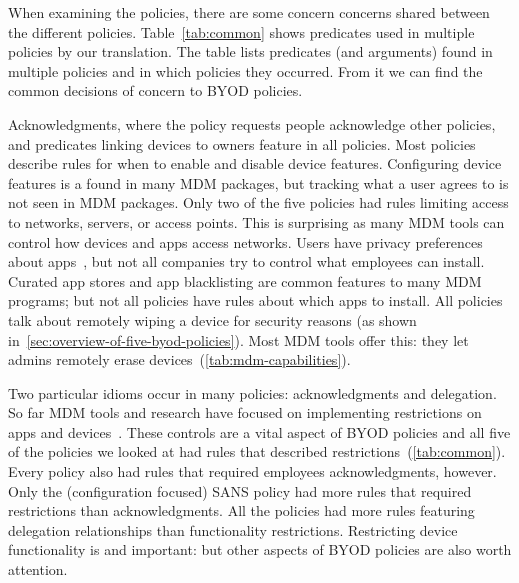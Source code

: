 \documentclass[thesis.tex]{subfiles}
\begin{document}
When examining the policies, there are some concern concerns shared between the
different policies. Table~\ref{tab:common} shows predicates used in multiple
policies by our translation. The table lists predicates (and arguments) found in
multiple policies and in which policies they occurred. From it we can find
the common decisions of concern to \ac{BYOD} policies.

Acknowledgments, where the policy requests people acknowledge other
policies, and predicates linking devices to owners feature in all
policies.  Most policies describe rules for when to enable and disable
device features.  Configuring device features is a found in
many \ac{MDM} packages, but tracking what a user agrees to is not seen
in \ac{MDM} packages.  Only two of the five policies had
rules limiting access to networks, servers, or access points. This is
surprising as many \ac{MDM} tools can control how
devices and apps access networks.  Users have privacy preferences
about apps~\cite{lin_modeling_2014}, but not all companies try to
control what employees can install.  Curated app stores and
app blacklisting are common features to many \ac{MDM} programs; but not
all policies have rules about which apps to install.  All
policies talk about remotely wiping a device for security reasons
(as shown in~\autoref{sec:overview-of-five-byod-policies}). Most
\ac{MDM} tools offer this: they let admins
remotely erase devices~(\autoref{tab:mdm-capabilities}).

Two particular idioms occur in many policies: acknowledgments and
delegation.  So far MDM tools and research have
focused on implementing restrictions on apps and
devices~\cite{ibm_ibm_nodate,armando_formal_2014,martinelli_enhancing_2016}.
These controls are a vital aspect of BYOD policies and all
five of the policies we looked at had rules that described
restrictions~(\autoref{tab:common}).  Every policy also had
rules that required employees acknowledgments, however.  Only the
(configuration focused) SANS policy had more rules
that required restrictions than acknowledgments.  All the policies
had more rules featuring delegation relationships than
functionality restrictions.  Restricting device functionality is
and important: but other aspects of BYOD policies are also
worth attention.
\end{document}
